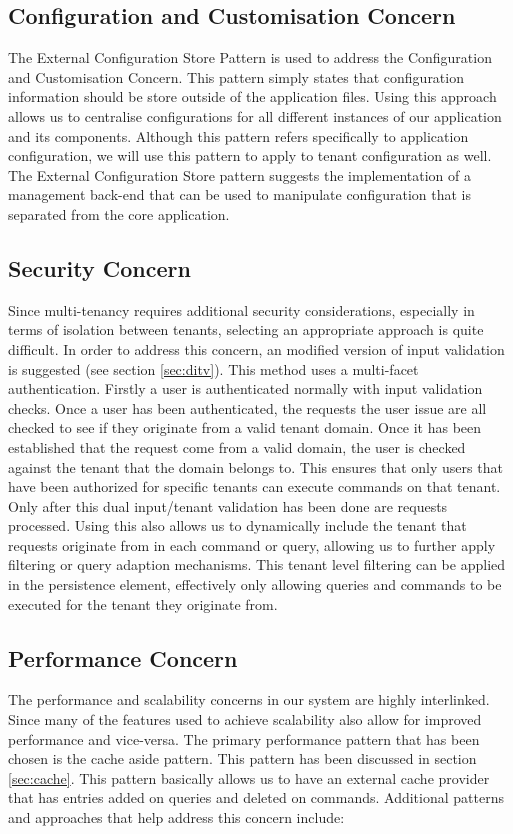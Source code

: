 \subsection{Configuration and Customisation Concern}
The External Configuration Store Pattern is used to address the Configuration and Customisation Concern. This pattern simply states that configuration information should be store outside of the application files. Using this approach allows us to centralise configurations for all different instances of our application and its components. Although this pattern refers specifically to application configuration, we will use this pattern to apply to tenant configuration as well. The External Configuration Store pattern suggests the implementation of a management back-end that can be used to manipulate configuration that is separated from the core application.

\subsection{Security Concern}
Since multi-tenancy requires additional security considerations, especially in terms of isolation between tenants, selecting an appropriate approach is quite difficult. In order to address this concern, an modified version of input validation is suggested (see section \ref{sec:ditv}). This method uses a multi-facet authentication. Firstly a user is authenticated normally with input validation checks. Once a user has been authenticated, the requests the user issue are all checked to see if they originate from a valid tenant domain. Once it has been established that the request come from a valid domain, the user is checked against the tenant that the domain belongs to. This ensures that only users that have been authorized for specific tenants can execute commands on that tenant. Only after this dual input/tenant validation has been done are requests processed. Using this also allows us to dynamically include the tenant that requests originate from in each command or query, allowing us to further apply filtering or query adaption mechanisms. This tenant level filtering can be applied in the persistence element, effectively only allowing queries and commands to be executed for the tenant they originate from. 


\subsection{Performance Concern}
The performance and scalability concerns in our system are highly interlinked. Since many of the features used to achieve scalability also allow for improved performance and vice-versa. The primary performance pattern that has been chosen is the cache aside pattern. This pattern has been discussed in section \ref{sec:cache}. This pattern basically allows us to have an external cache provider that has entries added on queries and deleted on commands. Additional patterns and approaches that help address this concern include:

